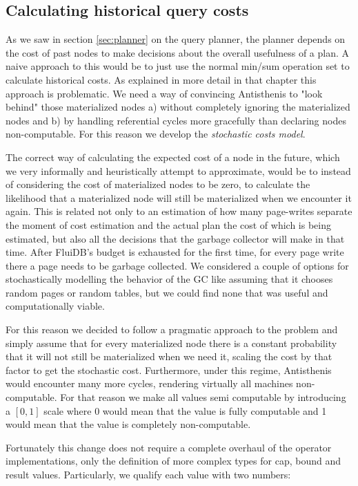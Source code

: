 \subsection{Calculating historical query costs}
\label{sec:historical_cost}

As we saw in section \ref{sec:planner} on the query planner, the planner depends
on the cost of past nodes to make decisions about the overall
usefulness of a plan. A naive approach to this would be to just use
the normal min/sum operation set to calculate historical costs. As
explained in more detail in that chapter this approach is
problematic. We need a way of convincing Antisthenis to "look behind"
those materialized nodes a) without completely ignoring the
materialized nodes and b) by handling referential cycles more
gracefully than declaring nodes non-computable. For this reason we
develop the \emph{stochastic costs model}.

The correct way of calculating the expected cost of a node in the
future, which we very informally and heuristically attempt to
approximate, would be to instead of considering the cost of
materialized nodes to be zero, to calculate the likelihood that a
materialized node will still be materialized when we encounter it
again. This is related not only to an estimation of how many
page-writes separate the moment of cost estimation and the actual plan
the cost of which is being estimated, but also all the decisions that
the garbage collector will make in that time. After FluiDB's budget is
exhausted for the first time, for every page write there a page needs
to be garbage collected. We considered a couple of options for
stochastically modelling the behavior of the GC like assuming that it
chooses random pages or random tables, but we could find none that was
useful and computationally viable.

For this reason we decided to follow a pragmatic approach to the
problem and simply assume that for every materialized node there is a
constant probability that it will not still be materialized when we
need it, scaling the cost by that factor to get the stochastic
cost. Furthermore, under this regime, Antisthenis would encounter many
more cycles, rendering virtually all machines non-computable. For that
reason we make all values semi computable by introducing a \([0,1]\)
scale where 0 would mean that the value is fully computable and 1
would mean that the value is completely non-computable.

Fortunately this change does not require a complete overhaul of the
operator implementations, only the definition of more complex types
for cap, bound and result values. Particularly, we qualify each value
with two numbers:

